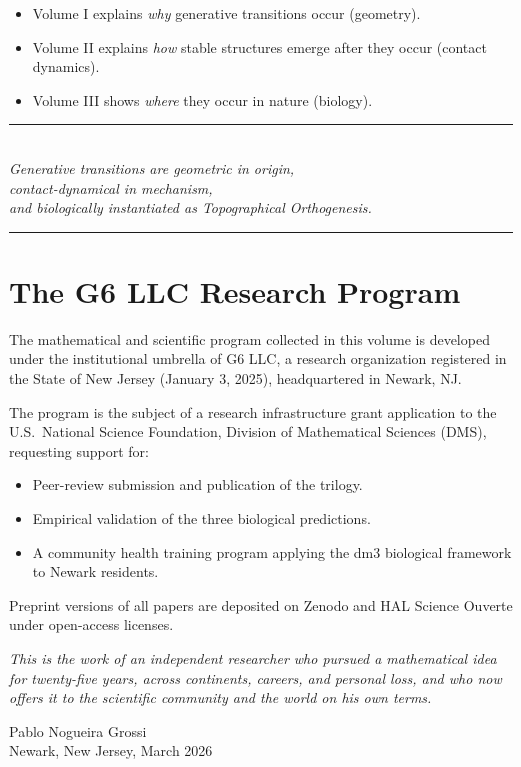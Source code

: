 \documentclass[12pt, oneside]{book}
\theoremstyle{plain}
\theoremstyle{definition}
\theoremstyle{remark}
\begin{document}
\begin{itemize}
\item Volume I explains \emph{why} generative transitions occur (geometry).
\item Volume II explains \emph{how} stable structures emerge after they occur
      (contact dynamics).
\item Volume III shows \emph{where} they occur in nature (biology).
\end{itemize}

\begin{center}
\rule{0.5\textwidth}{0.4pt}\\[0.6em]
\textit{Generative transitions are geometric in origin,\\
contact-dynamical in mechanism,\\
and biologically instantiated as Topographical Orthogenesis.}\\[0.6em]
\rule{0.5\textwidth}{0.4pt}
\end{center}

\section*{The G6 LLC Research Program}

The mathematical and scientific program collected in this volume is developed
under the institutional umbrella of G6 LLC, a research organization registered
in the State of New Jersey (January 3, 2025), headquartered in Newark, NJ.

The program is the subject of a research infrastructure grant application to
the U.S.\ National Science Foundation, Division of Mathematical Sciences (DMS),
requesting support for:
\begin{itemize}
\item Peer-review submission and publication of the trilogy.
\item Empirical validation of the three biological predictions.
\item A community health training program applying the dm3 biological
      framework to Newark residents.
\end{itemize}
Preprint versions of all papers are deposited on Zenodo and HAL Science
Ouverte under open-access licenses.

\bigskip
\begin{flushright}
\textit{This is the work of an independent researcher who pursued a
mathematical idea for twenty-five years, across continents, careers,
and personal loss, and who now offers it to the scientific community
and the world on his own terms.}

\medskip
Pablo Nogueira Grossi\\
Newark, New Jersey, March 2026
\end{flushright}
\end{document}
